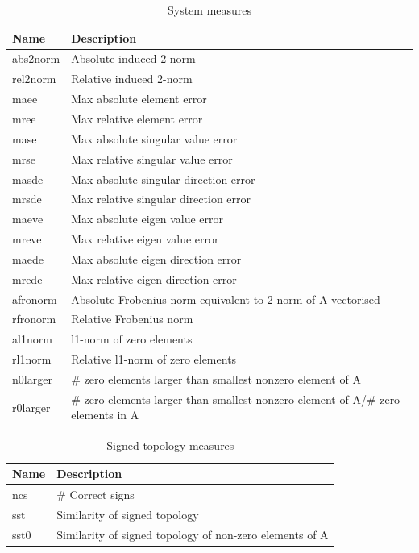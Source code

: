 \begin{bibunit}
\begin{table}[htb]
\caption{\label{tab:sys-measures}
System measures}
\centering
\begin{tabular}{|l|p{8cm}|}
\hline
Name & Description\\
\hline
abs2norm & Absolute induced 2-norm\\
rel2norm & Relative induced 2-norm\\
maee & Max absolute element error\\
mree & Max relative element error\\
mase & Max absolute singular value error\\
mrse & Max relative singular value error\\
masde & Max absolute singular direction error\\
mrsde & Max relative singular direction error\\
maeve & Max absolute eigen value error\\
mreve & Max relative eigen value error\\
maede & Max absolute eigen direction error\\
mrede & Max relative eigen direction error\\
afronorm & Absolute Frobenius norm equivalent to 2-norm of A vectorised\\
rfronorm & Relative Frobenius norm\\
al1norm & l1-norm of zero elements\\
rl1norm & Relative l1-norm of zero elements\\
n0larger & \# zero elements larger than smallest nonzero element of A\\
r0larger & \# zero elements larger than smallest nonzero element of A/\# zero elements in A\\
\hline
\end{tabular}
\end{table}


\begin{table}[htb]
\caption{\label{tab:signed-topo-measures}
Signed topology measures}
\centering
\begin{tabular}{|l|p{8cm}|}
\hline
Name & Description\\
\hline
ncs & \# Correct signs\\
sst & Similarity of signed topology\\
sst0 & Similarity of signed topology of non-zero elements of A\\
\hline
\end{tabular}
\end{table}



\end{bibunit}

